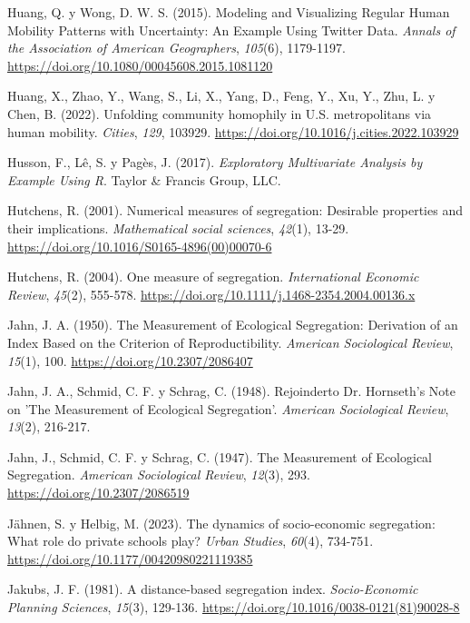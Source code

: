 \documentclass[
  spanish,
  a4paper,%
  chapterprefix=true,%
  DIV=calc,%
  twoside]{scrbook}%
\newlength{\cslhangindent}
\newenvironment{CSLReferences}[2] %
 {\begin{list}{}{%
  \setlength{\itemindent}{0pt}
  \setlength{\leftmargin}{0pt}
  \setlength{\parsep}{0pt}
  \ifodd #1
   \setlength{\leftmargin}{\cslhangindent}
   \setlength{\itemindent}{-1\cslhangindent}
  \fi
  \setlength{\itemsep}{#2\baselineskip}}}
 {\end{list}}
\begin{document}
\begin{CSLReferences}{1}{0}
Huang, Q. y Wong, D. W. S. (2015). Modeling and Visualizing Regular Human Mobility Patterns with Uncertainty: An Example Using Twitter Data. \emph{Annals of the Association of American Geographers}, \emph{105}(6), 1179-1197. \url{https://doi.org/10.1080/00045608.2015.1081120}

Huang, X., Zhao, Y., Wang, S., Li, X., Yang, D., Feng, Y., Xu, Y., Zhu, L. y Chen, B. (2022). Unfolding community homophily in U.S. metropolitans via human mobility. \emph{Cities}, \emph{129}, 103929. \url{https://doi.org/10.1016/j.cities.2022.103929}

Husson, F., Lê, S. y Pagès, J. (2017). \emph{Exploratory Multivariate Analysis by Example Using R}. Taylor \& Francis Group, LLC.

Hutchens, R. (2001). Numerical measures of segregation: Desirable properties and their implications. \emph{Mathematical social sciences}, \emph{42}(1), 13-29. \url{https://doi.org/10.1016/S0165-4896(00)00070-6}

Hutchens, R. (2004). One measure of segregation. \emph{International Economic Review}, \emph{45}(2), 555-578. \url{https://doi.org/10.1111/j.1468-2354.2004.00136.x}

Jahn, J. A. (1950). The Measurement of Ecological Segregation: Derivation of an Index Based on the Criterion of Reproductibility. \emph{American Sociological Review}, \emph{15}(1), 100. \url{https://doi.org/10.2307/2086407}

Jahn, J. A., Schmid, C. F. y Schrag, C. (1948). Rejoinderto Dr. Hornseth's Note on 'The Measurement of Ecological Segregation'. \emph{American Sociological Review}, \emph{13}(2), 216-217.

Jahn, J., Schmid, C. F. y Schrag, C. (1947). The Measurement of Ecological Segregation. \emph{American Sociological Review}, \emph{12}(3), 293. \url{https://doi.org/10.2307/2086519}

Jähnen, S. y Helbig, M. (2023). The dynamics of socio-economic segregation: What role do private schools play? \emph{Urban Studies}, \emph{60}(4), 734-751. \url{https://doi.org/10.1177/00420980221119385}

Jakubs, J. F. (1981). A distance-based segregation index. \emph{Socio-Economic Planning Sciences}, \emph{15}(3), 129-136. \url{https://doi.org/10.1016/0038-0121(81)90028-8}


\end{CSLReferences}
\end{document}
